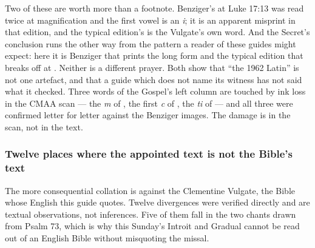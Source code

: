 Two of these are worth more than a footnote. Benziger's  at
Luke 17:13 was read twice at magnification and the first vowel is an \textit{i};
it is an apparent misprint in that edition, and the typical edition's
 is the Vulgate's own word. And the Secret's conclusion runs
the other way from the pattern a reader of these guides might expect: here it
is Benziger that prints the long form and the typical edition that breaks off
at . Neither is a different prayer. Both show that
``the 1962 Latin'' is not one artefact, and that a guide which does not name
its witness has not said what it checked. Three words of the Gospel's left
column are touched by ink loss in the CMAA scan --- the \textit{m} of
, the first \textit{c} of , the \textit{ti} of
 --- and all three were confirmed letter for letter against the
Benziger images. The damage is in the scan, not in the text.

\subsubsection*{Twelve places where the appointed text is not the Bible's text}

The more consequential collation is against the Clementine Vulgate, the Bible
whose English this guide quotes. Twelve divergences were verified directly and
are textual observations, not inferences. Five of them fall in the two chants
drawn from Psalm 73, which is why this Sunday's Introit and Gradual cannot be
read out of an English Bible without misquoting the missal.

